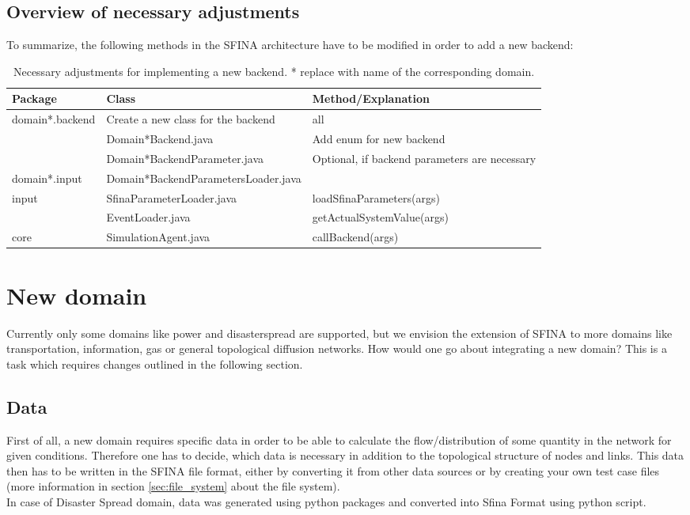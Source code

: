 \documentclass[11pt,fleqn]{book} %
\begin{document}
\subsection{Overview of necessary adjustments}
To summarize, the following methods in the SFINA architecture have to be modified in order to add a new backend:
\begin{table}[h]
	\centering
	\begin{tabular}{|l |l |l|}
	\hline
	\rowcolor{Gray}
	Package & Class & Method/Explanation\\
	\hline
	\multirow{3}{*}{domain*.backend}&Create a new class for the backend & all \\
	\cline{2-3}
	& Domain*Backend.java & Add enum for new backend \\
	\cline{2-3}
	& Domain*BackendParameter.java & \multirow{2}{*}{\parbox{4cm}{Optional, if backend parameters are necessary}}\\
	\cline{1-2}
	domain*.input & Domain*BackendParametersLoader.java & \\
	\hline
	\multirow{2}{*}{input} & SfinaParameterLoader.java & loadSfinaParameters(args)\\
	\cline{2-3}
	& EventLoader.java & getActualSystemValue(args)\\
	\hline
	core & SimulationAgent.java & callBackend(args)\\
	\hline
	\end{tabular}
	\label{table:new_backend}
	\caption{Necessary adjustments for implementing a new backend. * replace with name of the corresponding domain.}
\end{table}

\section{New domain}\label{sec:domain}
Currently only some domains like power and disaster\textunderscore spread are supported, but we envision the extension of SFINA to more domains like transportation, information, gas or general topological diffusion networks. How would one go about integrating a new domain? This is a task which requires changes outlined in the following section.

\subsection{Data}
First of all, a new domain requires specific data in order to be able to calculate the flow/distribution of some quantity in the network for given conditions. Therefore one has to decide, which data is necessary in addition to the topological structure of nodes and links. This data then has to be written in the SFINA file format, either by converting it from other data sources or by creating your own test case files (more information  in section \ref{sec:file_system} about the file system). \\
In case of Disaster Spread domain, data was generated using python packages and converted into Sfina Format using python script.
\end{document}
